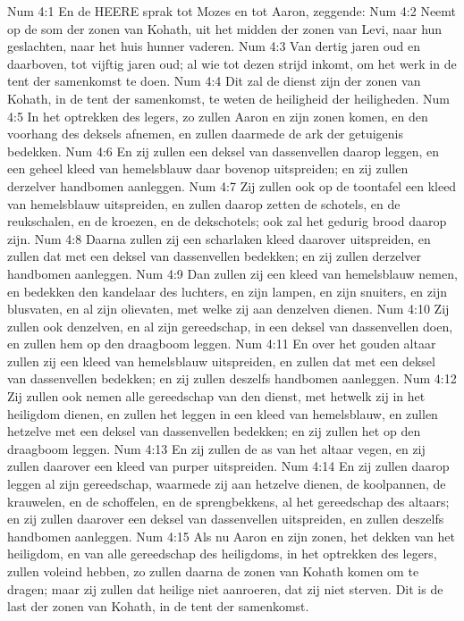 Num 4:1  En de HEERE sprak tot Mozes en tot Aaron, zeggende:
Num 4:2  Neemt op de som der zonen van Kohath, uit het midden der zonen van Levi, naar hun geslachten, naar het huis hunner vaderen.
Num 4:3  Van dertig jaren oud en daarboven, tot vijftig jaren oud; al wie tot dezen strijd inkomt, om het werk in de tent der samenkomst te doen.
Num 4:4  Dit zal de dienst zijn der zonen van Kohath, in de tent der samenkomst, te weten de heiligheid der heiligheden.
Num 4:5  In het optrekken des legers, zo zullen Aaron en zijn zonen komen, en den voorhang des deksels afnemen, en zullen daarmede de ark der getuigenis bedekken.
Num 4:6  En zij zullen een deksel van dassenvellen daarop leggen, en een geheel kleed van hemelsblauw daar bovenop uitspreiden; en zij zullen derzelver handbomen aanleggen.
Num 4:7  Zij zullen ook op de toontafel een kleed van hemelsblauw uitspreiden, en zullen daarop zetten de schotels, en de reukschalen, en de kroezen, en de dekschotels; ook zal het gedurig brood daarop zijn.
Num 4:8  Daarna zullen zij een scharlaken kleed daarover uitspreiden, en zullen dat met een deksel van dassenvellen bedekken; en zij zullen derzelver handbomen aanleggen.
Num 4:9  Dan zullen zij een kleed van hemelsblauw nemen, en bedekken den kandelaar des luchters, en zijn lampen, en zijn snuiters, en zijn blusvaten, en al zijn olievaten, met welke zij aan denzelven dienen.
Num 4:10  Zij zullen ook denzelven, en al zijn gereedschap, in een deksel van dassenvellen doen, en zullen hem op den draagboom leggen.
Num 4:11  En over het gouden altaar zullen zij een kleed van hemelsblauw uitspreiden, en zullen dat met een deksel van dassenvellen bedekken; en zij zullen deszelfs handbomen aanleggen.
Num 4:12  Zij zullen ook nemen alle gereedschap van den dienst, met hetwelk zij in het heiligdom dienen, en zullen het leggen in een kleed van hemelsblauw, en zullen hetzelve met een deksel van dassenvellen bedekken; en zij zullen het op den draagboom leggen.
Num 4:13  En zij zullen de as van het altaar vegen, en zij zullen daarover een kleed van purper uitspreiden.
Num 4:14  En zij zullen daarop leggen al zijn gereedschap, waarmede zij aan hetzelve dienen, de koolpannen, de krauwelen, en de schoffelen, en de sprengbekkens, al het gereedschap des altaars; en zij zullen daarover een deksel van dassenvellen uitspreiden, en zullen deszelfs handbomen aanleggen.
Num 4:15  Als nu Aaron en zijn zonen, het dekken van het heiligdom, en van alle gereedschap des heiligdoms, in het optrekken des legers, zullen voleind hebben, zo zullen daarna de zonen van Kohath komen om te dragen; maar zij zullen dat heilige niet aanroeren, dat zij niet sterven. Dit is de last der zonen van Kohath, in de tent der samenkomst.
